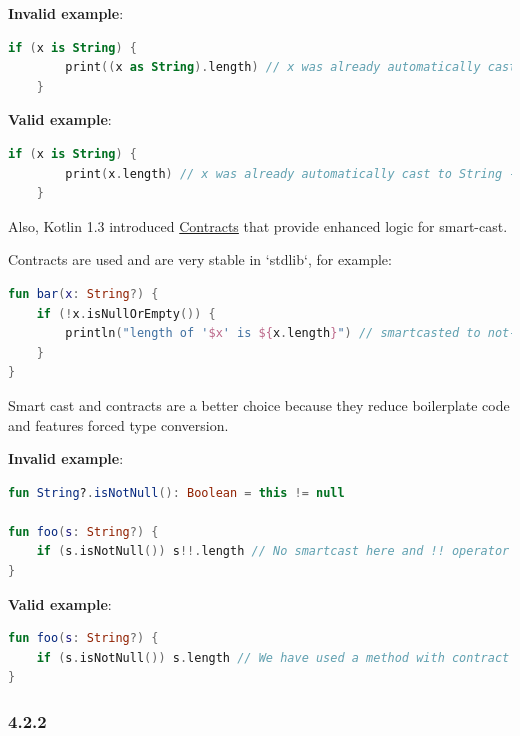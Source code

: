 {{{{\textbf{Invalid example}:

\begin{lstlisting}[language=Kotlin]
    if (x is String) {
        print((x as String).length) // x was already automatically cast to String - no need to use 'as' keyword here
    }
\end{lstlisting}


\textbf{Valid example}:

\begin{lstlisting}[language=Kotlin]
    if (x is String) {
        print(x.length) // x was already automatically cast to String - no need to use 'as' keyword here
    }
\end{lstlisting}


Also, Kotlin 1.3 introduced \href{https://kotlinlang.org/docs/reference/whatsnew13.html#contracts}{Contracts} that provide enhanced logic for smart-cast.

Contracts are used and are very stable in `stdlib`, for example:

 



\begin{lstlisting}[language=Kotlin]
fun bar(x: String?) {
    if (!x.isNullOrEmpty()) {
        println("length of '$x' is ${x.length}") // smartcasted to not-null
    }
} 
\end{lstlisting}


Smart cast and contracts are a better choice because they reduce boilerplate code and features forced type conversion.



\textbf{Invalid example}:

\begin{lstlisting}[language=Kotlin]
fun String?.isNotNull(): Boolean = this != null

fun foo(s: String?) {
    if (s.isNotNull()) s!!.length // No smartcast here and !! operator is used
}
\end{lstlisting}


\textbf{Valid example}:

\begin{lstlisting}[language=Kotlin]
fun foo(s: String?) {
    if (s.isNotNull()) s.length // We have used a method with contract from stdlib that helped compiler to execute smart cast
}
\end{lstlisting}


\subsubsection*{\textbf{4.2.2}}
\leavevmode\newline



}}}}
